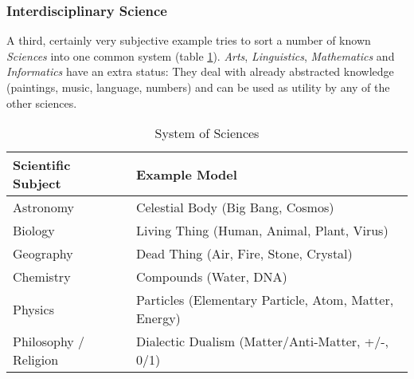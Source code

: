 %
%
%
%
%
%
%

\subsubsection{Interdisciplinary Science}
\label{interdisciplinary_science_heading}

A third, certainly very subjective example tries to sort a number of known
\emph{Sciences} into one common system (table \ref{sciences_table}).
\emph{Arts}, \emph{Linguistics}, \emph{Mathematics} and \emph{Informatics} have
an extra status: They deal with already abstracted knowledge (paintings, music,
language, numbers) and can be used as utility by any of the other sciences.

\begin{table}[ht]
    \begin{center}
        \begin{footnotesize}
        \begin{tabular}{| p{35mm} | p{70mm} |}
            \hline
            \textbf{Scientific Subject} & \textbf{Example Model}\\
            \hline
            Astronomy & Celestial Body (Big Bang, Cosmos)\\
            \hline
            Biology & Living Thing (Human, Animal, Plant, Virus)\\
            \hline
            Geography & Dead Thing (Air, Fire, Stone, Crystal)\\
            \hline
            Chemistry & Compounds (Water, DNA)\\
            \hline
            Physics & Particles (Elementary Particle, Atom, Matter, Energy)\\
            \hline
            Philosophy / Religion & Dialectic Dualism (Matter/Anti-Matter, +/-, 0/1)\\
            \hline
        \end{tabular}
        \end{footnotesize}
        \caption{System of Sciences}
        \label{sciences_table}
    \end{center}
\end{table}

